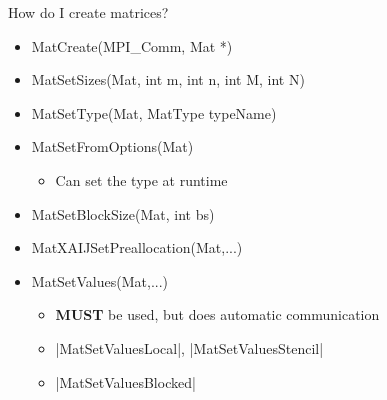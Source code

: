 \begin{frame}{How do I create matrices?}

\begin{itemize}
  \item {\kb MatCreate(MPI\_Comm, Mat *)}
  \item {\kb MatSetSizes(Mat, int m, int n, int M, int N)}
  \item {\kb MatSetType(Mat, MatType typeName)}
  \item {\kb MatSetFromOptions(Mat)}
  \begin{itemize}
    \item Can set the type at runtime
  \end{itemize}
  \item {\kb MatSetBlockSize(Mat, int bs)}
  \item {\kb MatXAIJSetPreallocation(Mat,...)} %
  \item {\kb MatSetValues(Mat,...)}
  \begin{itemize}
    \item {\bf MUST} be used, but does automatic communication
    \item \cfunc|MatSetValuesLocal|, \cfunc|MatSetValuesStencil|
    \item \cfunc|MatSetValuesBlocked|
  \end{itemize}
\end{itemize}
\end{frame}

